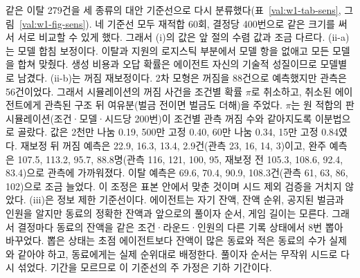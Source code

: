 같은 이탈 279건을 세 종류의 대안 기준선으로 다시 분류했다(표~\ref{val:w1-tab-sens}, 그림~\ref{val:w1-fig-sens}). 네 기준선 모두 재적합 60회, 결정당 400번으로 같은 크기를 써서 서로 비교할 수 있게 했다. 그래서 (i)의 값은 앞 절의 수렴 값과 조금 다르다. (ii-a)는 모델 합침 보정이다. 이탈과 지원의 로지스틱 부분에서 모델 항을 없애고 모든 모델을 합쳐 맞췄다. 생성 비용과 오답 확률은 에이전트 자신의 기술적 성질이므로 모델별로 남겼다. (ii-b)는 꺼짐 재보정이다. 2차 모형은 꺼짐을 88건으로 예측했지만 관측은 56건이었다. 그래서 시뮬레이션의 꺼짐 사건을 조건별 확률 $\pi$로 취소하고, 취소된 에이전트에게 관측된 구조 뒤 여유분(벌금 전이면 벌금도 더해)을 주었다. $\pi$는 원 적합의 판 시뮬레이션(조건·모델·시드당 200번)이 조건별 관측 꺼짐 수와 같아지도록 이분법으로 골랐다. 값은 2천만 나눔 0.19, 500만 고정 0.40, 60만 나눔 0.34, 15만 고정 0.84였다. 재보정 뒤 꺼짐 예측은 22.9, 16.3, 13.4, 2.9건(관측 23, 16, 14, 3)이고, 완주 예측은 107.5, 113.2, 95.7, 88.8명(관측 116, 121, 100, 95, 재보정 전 105.3, 108.6, 92.4, 83.4)으로 관측에 가까워졌다. 이탈 예측은 69.6, 70.4, 90.9, 108.3건(관측 61, 63, 86, 102)으로 조금 늘었다. 이 조정은 표본 안에서 맞춘 것이며 시드 제외 검증을 거치지 않았다. (iii)은 정보 제한 기준선이다. 에이전트는 자기 잔액, 잔액 순위, 공지된 벌금과 인원을 알지만 동료의 정확한 잔액과 앞으로의 풀이자 순서, 게임 길이는 모른다. 그래서 결정마다 동료의 잔액을 같은 조건·라운드·인원의 다른 기록 상태에서 8번 뽑아 바꾸었다. 뽑은 상태는 초점 에이전트보다 잔액이 많은 동료와 적은 동료의 수가 실제와 같아야 하고, 동료에게는 실제 순위대로 배정한다. 풀이자 순서는 무작위 시드로 다시 섞었다. 기간을 모르므로 이 기준선의 주 가정은 기하 기간이다.

\begin{table}[t]
\centering
\caption{기준선에 따른 LLM 이탈 279건의 견고한 손실 수(괄호는 몬테카를로 표준오차). 네 기준선 모두 재적합 60회, 결정당 400번이다. ``원 적합 손실''은 원 적합에서 $H=8$, 보정 지원, $W=0$의 차이가 0보다 큰 이탈 수(구간 없음)이고, $H^{*}$는 이탈의 재적합 중앙값 [2.5, 97.5\%]이다((i)은 $B=200$, $R=1{,}600$). (ii-b)는 30개 가정 전체에서도 1건이 손실이다. 견고한 일치는 (i) 1건, (ii-a) 2건이고 나머지는 0건이다.}
\label{val:w1-tab-sens}
\end{table}

